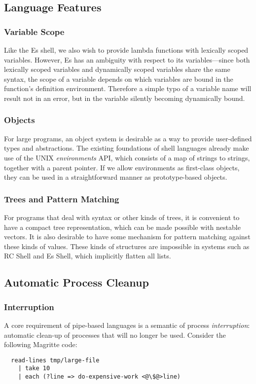 \documentclass[english,preprint,JIP,uplatex]{ipsj}
\begin{document}
\subsection{Language Features}
\subsubsection{Variable Scope}\noindent
Like the Es shell, we also wish to provide lambda functions with lexically scoped variables. However, Es has an ambiguity with respect to its variables---since both lexically scoped variables and dynamically scoped variables share the same syntax, the scope of a variable depends on which variables are bound in the function's definition environment. Therefore a simple typo of a variable name will result not in an error, but in the variable silently becoming dynamically bound.

\subsubsection{Objects}\noindent
For large programs, an object system is desirable as a way to provide user-defined types and abstractions. The existing foundations of shell languages already make use of the UNIX \emph{environments} API, which consists of a map of strings to strings, together with a parent pointer. If we allow environments as first-class objects, they can be used in a straightforward manner as prototype-based objects.

\subsubsection{Trees and Pattern Matching}\noindent
For programs that deal with syntax or other kinds of trees, it is convenient to have a compact tree representation, which can be made possible with nestable vectors. It is also desirable to have some mechanism for pattern matching against these kinds of values. These kinds of structures are impossible in systems such as RC Shell\cite{duff} and Es Shell, which implicitly flatten all lists.

\subsection{Automatic Process Cleanup}
\subsubsection{Interruption}\noindent
A core requirement of pipe-based languages is a semantic of process \emph{interruption}: automatic clean-up of processes that will no longer be used. Consider the following Magritte code:
\begin{lstlisting}
  read-lines tmp/large-file
    | take 10
    | each (?line => do-expensive-work <@\$@>line)
\end{lstlisting}
\end{document}
